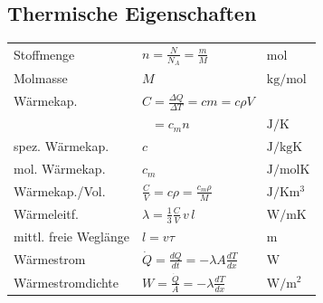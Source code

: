 


\subsection{Thermische Eigenschaften}
\begin{symbolbox}
    \begin{tabular*}{\columnwidth}{@{}lll@{}}
        Stoffmenge & $n=\frac{N}{N_A}=\frac{m}{M}$ & $\si{\mol}$ \\
        Molmasse & $M$ & $\si{\kilogram\per\mol}$ \\
        Wärmekap. & $C=\frac{\Delta Q}{\Delta T}=cm=c\rho V$ & \\
        & $\phantom{C}=c_m n$ & $\si{\joule\per\kelvin}$ \\
        spez. Wärmekap. & $c$ & $\si{\joule\per\kilogram\kelvin}$ \\
        mol. Wärmekap. & $c_m$ & $\si{\joule\per\mol\kelvin}$ \\
        Wärmekap./Vol. & $\frac{C}{V}=c\rho=\frac{c_m\rho}{M}$ & $\si{\joule\per\kelvin\cubic\meter}$ \\
        Wärmeleitf. & $\lambda=\frac{1}{3}\frac{C}{V}\,v\,l$ & $\si{\watt\per\meter\kelvin}$ \\
        mittl. freie Weglänge & $l=v\tau$ & $\si{\meter}$ \\
        Wärmestrom & $\dot Q=\frac{dQ}{dt}=-\lambda A\frac{dT}{dx}$ & $\si{\watt}$ \\
        Wärmestromdichte & $W=\frac{\dot Q}{A}=-\lambda\frac{dT}{dx}$ & $\si{\watt\per\square\meter}$
    \end{tabular*}
\end{symbolbox}

